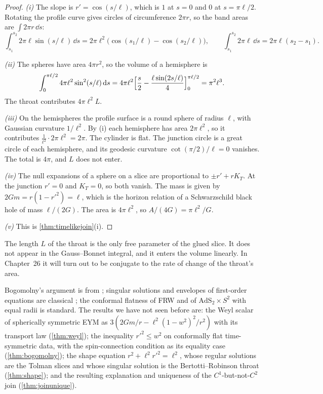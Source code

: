 \begin{proof}
\emph{(i)} The slope is $r'=\cos(s/\ell)$, which is $1$ at $s=0$ and $0$ at $s=\pi\ell/2$. Rotating the profile curve gives circles of circumference $2\pi r$, so the band areas are $\int2\pi r\,\dd s$:
\[
\int_{s_1}^{s_2}2\pi\ell\sin(s/\ell)\,\dd s=2\pi\ell^2\bigl(\cos(s_1/\ell)-\cos(s_2/\ell)\bigr),\qquad\int_{s_1}^{s_2}2\pi\ell\,\dd s=2\pi\ell(s_2-s_1).
\]

\emph{(ii)} The spheres have area $4\pi r^2$, so the volume of a hemisphere is
\[
\int_0^{\pi\ell/2}4\pi\ell^2\sin^2(s/\ell)\,\mathrm{d} s=4\pi\ell^2\Bigl[\frac s2-\frac{\ell\sin(2s/\ell)}4\Bigr]_0^{\pi\ell/2}=\pi^2\ell^3 .
\]
The throat contributes $4\pi\ell^2L$.

\emph{(iii)} On the hemispheres the profile surface is a round sphere of radius $\ell$, with Gaussian curvature $1/\ell^2$. By (i) each hemisphere has area $2\pi\ell^2$, so it contributes $\frac1{\ell^2}\cdot2\pi\ell^2=2\pi$. The cylinder is flat. The junction circle is a great circle of each hemisphere, and its geodesic curvature $\cot(\pi/2)/\ell=0$ vanishes. The total is $4\pi$, and $L$ does not enter.

\emph{(iv)} The null expansions of a sphere on a slice are proportional to $\pm r'+rK_T$. At the junction $r'=0$ and $K_T=0$, so both vanish. The mass is given by $2Gm=r(1-r'^2)=\ell$, which is the horizon relation of a Schwarzschild black hole of mass $\ell/(2G)$. The area is $4\pi\ell^2$, so $A/(4G)=\pi\ell^2/G$.

\emph{(v)} This is \cref{thm:timelikejoin}(i).
\end{proof}


The length $L$ of the throat is the only free parameter of the glued slice. It does not appear in the Gauss--Bonnet integral, and it enters the volume linearly. In Chapter~26 it will turn out to be conjugate to the rate of change of the throat's area.

\begin{litbox}
Bogomolny's argument is from \cite{Bogomolny1976}; singular solutions and envelopes of first-order equations are classical \cite{Ince}; the conformal flatness of FRW and of $\mathrm{AdS}_2\times S^2$ with equal radii is standard. The results we have not seen before are: the Weyl scalar of spherically symmetric EYM as $3(2Gm/r-\ell^2(1-w^2)^2/r^2)$ with its transport law (\cref{thm:weyl}); the inequality $r'^2\le w^2$ on conformally flat time-symmetric data, with the spin-connection condition as its equality case (\cref{thm:bogomolny}); the shape equation $r^2+\ell^2r'^2=\ell^2$, whose regular solutions are the Tolman slices and whose singular solution is the Bertotti--Robinson throat (\cref{thm:shape}); and the resulting explanation and uniqueness of the $C^1$-but-not-$C^2$ join (\cref{thm:joinunique}).
\end{litbox}

